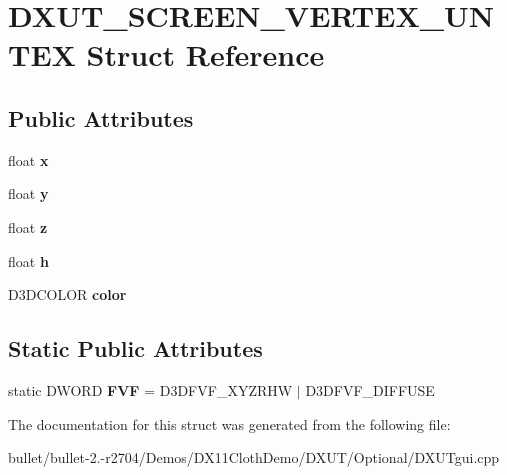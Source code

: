 \hypertarget{struct_d_x_u_t___s_c_r_e_e_n___v_e_r_t_e_x___u_n_t_e_x}{\section{D\+X\+U\+T\+\_\+\+S\+C\+R\+E\+E\+N\+\_\+\+V\+E\+R\+T\+E\+X\+\_\+\+U\+N\+T\+E\+X Struct Reference}
\label{struct_d_x_u_t___s_c_r_e_e_n___v_e_r_t_e_x___u_n_t_e_x}
}
\subsection*{Public Attributes}
\begin{DoxyCompactItemize}
\item 
\hypertarget{struct_d_x_u_t___s_c_r_e_e_n___v_e_r_t_e_x___u_n_t_e_x_a8385e54d50531a96114e6c2e1de0a2c3}{float {\bfseries x}}\label{struct_d_x_u_t___s_c_r_e_e_n___v_e_r_t_e_x___u_n_t_e_x_a8385e54d50531a96114e6c2e1de0a2c3}

\item 
\hypertarget{struct_d_x_u_t___s_c_r_e_e_n___v_e_r_t_e_x___u_n_t_e_x_a7dba6abd9d324dd56538daabdaa21fe6}{float {\bfseries y}}\label{struct_d_x_u_t___s_c_r_e_e_n___v_e_r_t_e_x___u_n_t_e_x_a7dba6abd9d324dd56538daabdaa21fe6}

\item 
\hypertarget{struct_d_x_u_t___s_c_r_e_e_n___v_e_r_t_e_x___u_n_t_e_x_a7289e8e6f39d6c0a89fa299431b4408d}{float {\bfseries z}}\label{struct_d_x_u_t___s_c_r_e_e_n___v_e_r_t_e_x___u_n_t_e_x_a7289e8e6f39d6c0a89fa299431b4408d}

\item 
\hypertarget{struct_d_x_u_t___s_c_r_e_e_n___v_e_r_t_e_x___u_n_t_e_x_ab1a4ff23bc7135fb547dfde18a551ab6}{float {\bfseries h}}\label{struct_d_x_u_t___s_c_r_e_e_n___v_e_r_t_e_x___u_n_t_e_x_ab1a4ff23bc7135fb547dfde18a551ab6}

\item 
\hypertarget{struct_d_x_u_t___s_c_r_e_e_n___v_e_r_t_e_x___u_n_t_e_x_aad704c036aa8cb76b52a1a46cc3ace70}{D3\+D\+C\+O\+L\+O\+R {\bfseries color}}\label{struct_d_x_u_t___s_c_r_e_e_n___v_e_r_t_e_x___u_n_t_e_x_aad704c036aa8cb76b52a1a46cc3ace70}

\end{DoxyCompactItemize}
\subsection*{Static Public Attributes}
\begin{DoxyCompactItemize}
\item 
\hypertarget{struct_d_x_u_t___s_c_r_e_e_n___v_e_r_t_e_x___u_n_t_e_x_ad33ec3f4bf46dbff5fca5b39d0f72a82}{static D\+W\+O\+R\+D {\bfseries F\+V\+F} = D3\+D\+F\+V\+F\+\_\+\+X\+Y\+Z\+R\+H\+W $\vert$ D3\+D\+F\+V\+F\+\_\+\+D\+I\+F\+F\+U\+S\+E}\label{struct_d_x_u_t___s_c_r_e_e_n___v_e_r_t_e_x___u_n_t_e_x_ad33ec3f4bf46dbff5fca5b39d0f72a82}

\end{DoxyCompactItemize}


The documentation for this struct was generated from the following file\+:\begin{DoxyCompactItemize}
\item 
bullet/bullet-\/2.-\/r2704/\+Demos/\+D\+X11\+Cloth\+Demo/\+D\+X\+U\+T/\+Optional/D\+X\+U\+Tgui.\+cpp\end{DoxyCompactItemize}
